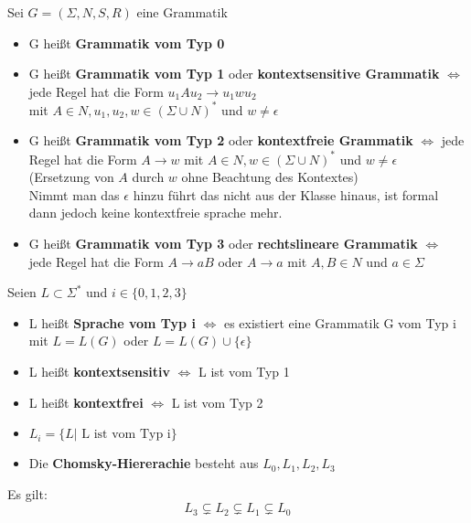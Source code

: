\documentclass[14pt]{article}
\begin{document}
\begin{definition} 
    Sei $G = (\varSigma, N, S, R)$ eine Grammatik
    \begin{itemize}
        \item G heißt \textbf{Grammatik vom Typ 0}
        \item G heißt \textbf{Grammatik vom Typ 1} oder \textbf{kontextsensitive Grammatik}
        $\Leftrightarrow$ jede Regel hat die Form $u_1Au_2 \rightarrow u_1wu_2$ \\ mit $A \in N,
        u_1, u_2, w \in (\varSigma \cup N)^*$ und $w \neq \epsilon$
        \item G heißt \textbf{Grammatik vom Typ 2} oder \textbf{kontextfreie Grammatik}
        $\Leftrightarrow$ jede Regel hat die Form $A \rightarrow w$ mit $A \in N, 
        w \in (\varSigma \cup N)^*$ und $w \neq \epsilon$ \\
        (Ersetzung von $A$ durch $w$ ohne Beachtung des Kontextes) \\
        Nimmt man das $\epsilon$ hinzu führt das nicht aus der Klasse hinaus, ist formal
        dann jedoch keine kontextfreie sprache mehr.
        \item G heißt \textbf{Grammatik vom Typ 3} oder \textbf{rechtslineare Grammatik}
        $\Leftrightarrow$ jede Regel hat die Form $A \rightarrow aB$ oder $A \rightarrow a$
        mit $A, B \in N$ und $a \in \varSigma$
    \end{itemize}
\end{definition}
\begin{definition}
    Seien $L \subset \varSigma^*$ und $i \in \{ 0, 1, 2, 3\}$
    \begin{itemize}
        \item L heißt \textbf{Sprache vom Typ i} $\Leftrightarrow$ es existiert eine 
        Grammatik G vom Typ i mit $L = L(G)$ oder $L = L(G) \cup \{ \epsilon \}$
        \item L heißt \textbf{kontextsensitiv} $\Leftrightarrow$ L ist vom Typ 1
        \item L heißt \textbf{kontextfrei} $\Leftrightarrow$ L ist vom Typ 2
        \item $L_i = \{ L | \text{ L ist vom Typ i}\}$
        \item Die \textbf{Chomsky-Hiererachie} besteht aus $L_0, L_1, L_2, L_3$
    \end{itemize}
    Es gilt: 
    \[
        L_3 \subsetneq L_2 \subsetneq L_1 \subsetneq L_0  
    \]
\end{definition}
\end{document}
